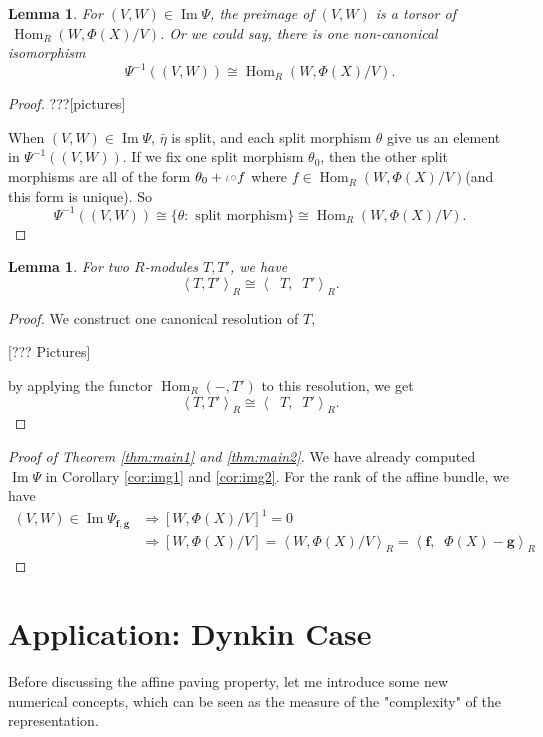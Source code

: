 \documentclass[reqno,11pt]{amsart}
\numberwithin{equation}{section}
\theoremstyle{plain}
\newtheorem{lemma}[theorem]{Lemma}
\theoremstyle{plain}
\numberwithin{equation}{section}
\theoremstyle{remark}
\DeclareMathOperator{\Img}{\operatorname{Im}}
\DeclareMathOperator{\Hom}{\operatorname{Hom}}
\DeclareMathOperator{\dimv}{\operatorname{\underline{\mathbf{dim}}}}
\newcommand{\dimvec}[1]{\mathbf{#1}}
\begin{document}
\begin{lemma}
	For $(V,W) \in \Img \Psi$, the preimage of $(V,W)$ is a torsor of $\,\Hom_{R}(W,\Phi(X)/V)$. Or we could say, there is one non-canonical isomorphism
	$$\Psi^{-1}((V,W)) \cong \Hom_{R}(W,\Phi(X)/V).$$
\end{lemma}
\begin{proof}
???[pictures]

When $(V,W) \in \Img \Psi$, $\bar{\eta}$ is split, and each split morphism $\theta$ give us an element in $\Psi^{-1}((V,W))$. If we fix one split morphism $\theta_0$, then the other split morphisms are all of the form $\theta_0 + \textcolor{gray}{\iota \circ} f$ where $f \in \Hom_{R}(W,\Phi(X)/V)$(and this form is unique). So
$$\Psi^{-1}((V,W)) \cong \{ \theta: \text{ split morphism} \} \cong \Hom_{R}(W,\Phi(X)/V).$$
\end{proof}
\begin{lemma}
	For two $R$-modules $T,T'$, we have
	$$	\left< T,T'\right>_R \cong 	\left< \dimv T,\dimv T'\right>_R.$$
\end{lemma}
\begin{proof}
We construct one canonical resolution of $T$,

[??? Pictures]

by applying the functor $\Hom_R(-,T')$ to this resolution, we get
$$	\left< T,T'\right>_R \cong 	\left< \dimv T,\dimv T'\right>_R.$$
\end{proof}
\begin{proof}[{Proof of Theorem \ref{thm:main1} and \ref{thm:main2}}]
We have already computed $\Img \Psi$ in Corollary \ref{cor:img1} and \ref{cor:img2}. For the rank of the affine bundle, we have 
\begin{equation*}
\begin{aligned}
(V,W) \in \Img \Psi_{\dimvec{f},\dimvec{g}} &\Longrightarrow [W,\Phi(X)/V]^1=0\\
& \Longrightarrow [W,\Phi(X)/V]=\left< W,\Phi(X)/V\right>_R=\left< \dimvec{f},\dimv \Phi(X)-\dimvec{g}\right>_R
\end{aligned}
\end{equation*}
\end{proof}

\section{Application: Dynkin Case}
Before discussing the affine paving property, let me introduce some new numerical concepts, which can be seen as the measure of the "complexity" of the representation.
\end{document}
